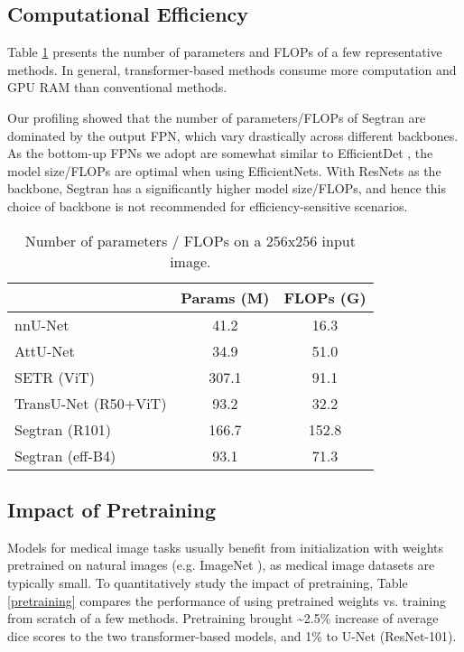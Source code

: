 \documentclass{article}
\begin{document}
\subsection{Computational Efficiency}
Table \ref{flops} presents the number of parameters and FLOPs of a few representative methods. In general, transformer-based methods consume more computation and GPU RAM than conventional methods.

Our profiling showed that the number of parameters/FLOPs of Segtran are dominated by the output FPN, which vary drastically across different backbones. As the bottom-up FPNs we adopt are somewhat similar to EfficientDet \cite{efficientdet}, the model size/FLOPs are optimal when using EfficientNets. With ResNets as the backbone, Segtran has a significantly higher model size/FLOPs, and hence this choice of backbone is not recommended for efficiency-sensitive scenarios.

\begin{table}[h]
\begin{centering}
\begin{tabular}{|m{3.5cm}|c|c|}
\hline
& Params (M) & FLOPs (G) \tabularnewline \hline 
nnU-Net & 41.2 & 16.3 \tabularnewline \hline 
AttU-Net & 34.9 & 51.0  \tabularnewline \hline 
SETR (ViT) & 307.1 & 91.1  \tabularnewline \hline 
TransU-Net (R50+ViT) & 93.2 & 32.2  \tabularnewline \hline 
Segtran (R101) & 166.7 & 152.8 \tabularnewline \hline 
Segtran (eff-B4) & 93.1 & 71.3 \tabularnewline \hline 
\end{tabular}
\caption{Number of parameters / FLOPs on a 256x256 input image.} \label{flops}
\par\end{centering}
\end{table}

\subsection{Impact of Pretraining}
Models for medical image tasks usually benefit from initialization with weights pretrained on natural images (e.g. ImageNet \cite{imagenet}), as medical image datasets are typically small. To quantitatively study the impact of pretraining, Table \ref{pretraining} compares the performance of using pretrained weights vs. training from scratch of a few methods. Pretraining brought \textasciitilde2.5\% increase of average dice scores to the two transformer-based models, and 1\% to U-Net (ResNet-101).
\end{document}
